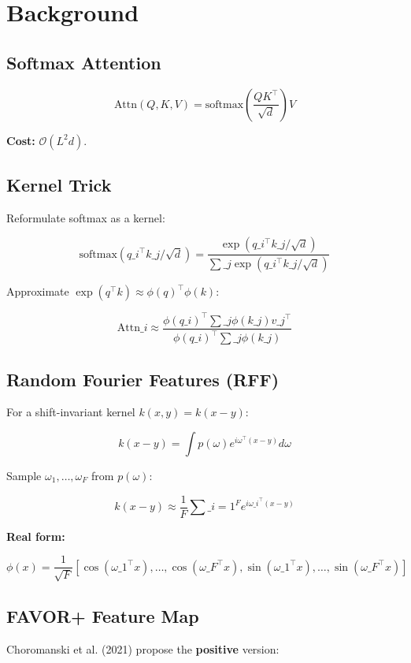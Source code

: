 
\section{Background}

\subsection{Softmax Attention}

\[
\text{Attn}(Q, K, V) = \text{softmax}\!\left(\frac{QK^\top}{\sqrt{d}}\right)V
\tag{3.1}
\]

\textbf{Cost:} $\mathcal{O}(L^2 d)$.

\subsection{Kernel Trick}

Reformulate softmax as a kernel:

\[
\text{softmax}(q\_i^\top k\_j / \sqrt{d}) = \frac{\exp(q\_i^\top k\_j / \sqrt{d})}{\sum\_j \exp(q\_i^\top k\_j / \sqrt{d})}
\tag{3.2}
\]

Approximate $\exp(q^\top k) \approx \phi(q)^\top \phi(k)$:

\[
\text{Attn}\_i \approx \frac{\phi(q\_i)^\top \sum\_j \phi(k\_j) v\_j^\top}{\phi(q\_i)^\top \sum\_j \phi(k\_j)}
\tag{3.3}
\]

\subsection{Random Fourier Features (RFF)}

For a shift-invariant kernel $k(x, y) = k(x - y)$:

\[
k(x - y) = \int p(\omega) e^{i \omega^\top (x - y)} d\omega
\tag{3.4}
\]

Sample $\omega_1, \dots, \omega_F$ from $p(\omega)$:

\[
k(x - y) \approx \frac{1}{F} \sum\_{i=1}^{F} e^{i \omega\_i^\top (x - y)}
\tag{3.5}
\]

\textbf{Real form:}

\[
\phi(x) = \frac{1}{\sqrt{F}} [\cos(\omega\_1^\top x), \dots, \cos(\omega\_F^\top x), \sin(\omega\_1^\top x), \dots, \sin(\omega\_F^\top x)]
\tag{3.6}
\]

\subsection{FAVOR+ Feature Map}

Choromanski et al. (2021) propose the \textbf{positive} version:

